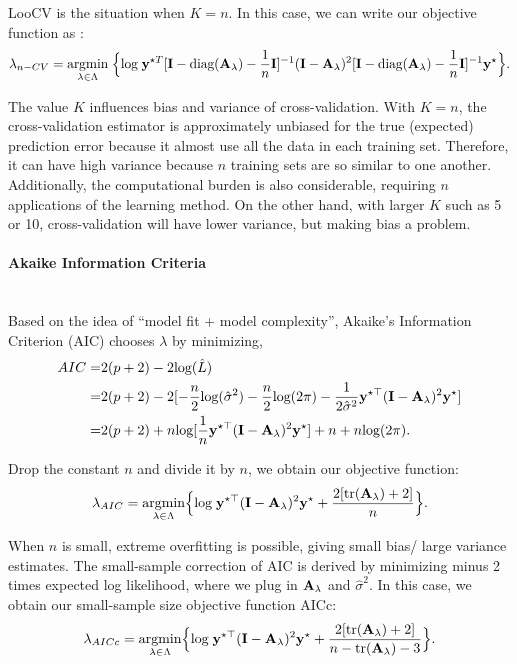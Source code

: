 \documentclass[article]{jss}
\begin{document}
LooCV is the situation when $K=n$. In this case, we can write our objective function as \citep{golub_generalized_1979}:
\begin{align}
\lambda_{n-CV}=\underset{\lambda \in \Lambda}{\mbox{argmin}}\;\Big\{\mbox{log}\;{\bf y}^{\star T}[{\bf I}-\mbox{diag}({\bf A}_\lambda)-\frac{1}{n}{\bf I}]^{-1}({\bf I}-{\bf A}_\lambda)^2[{\bf I}-\mbox{diag}({\bf A}_\lambda)-\frac{1}{n}{\bf I}]^{-1}{\bf y}^\star \Big\}. \label{3}
\end{align}

The value $K$ influences bias and variance of cross-validation. With $K=n$, the cross-validation estimator is approximately unbiased for the true (expected) prediction error because it almost use all the data in each training set. Therefore, it can have high variance because $n$ training sets are so similar to one another. Additionally, the computational burden is also considerable, requiring $n$ applications of the learning method. On the other hand, with larger $K$ such as 5 \citep{hastie_elements_2009} or 10, cross-validation will have lower variance, but making bias a problem.

\paragraph{Akaike Information Criteria}\mbox{}\\
Based on the idea of ``model fit + model complexity'', Akaike's Information Criterion (AIC) \citep{akaike_information_1998} chooses $\lambda$ by minimizing,
\begin{align*}
AIC=&2(p+2)-2\mbox{log}(\hat{L})\\
=&2(p+2)-2[-\frac{n}{2}\mbox{log} (\hat{\sigma}^2)-\frac{n}{2}\mbox{log} (2\pi)-\frac{1}{2\hat{\sigma}^2}{\bf y}^{\star \top}({\bf I}-{\bf A}_\lambda)^2{\bf y}^\star]\\
=&2(p+2)+n \mbox{log}[\frac{1}{n}{\bf y}^{\star \top}({\bf I}-{\bf A}_\lambda)^2{\bf y}^\star]+n+n \mbox{log}(2\pi).
\end{align*}

Drop the constant $n$ and divide it by $n$, we obtain our objective function:
\begin{align}
\lambda_{AIC}=\underset{\lambda \in \Lambda}{\mbox{argmin}}\Big\{\mbox{log}\; {\bf y}^{\star \top}({\bf I}-{\bf A}_\lambda)^2{\bf y}^\star+\frac{2[\mbox{tr}({\bf A}_\lambda)+2]}{n}\Big\}. \label{1}
\end{align}

When $n$ is small, extreme overfitting is possible, giving small bias/ large variance estimates. The small-sample correction of AIC \citep{hurvich_regression_1989, hurvich_clifford_m._smoothing_2002} is derived by minimizing minus 2 times expected log likelihood, where we plug in ${\bf A}_\lambda$ and $\hat{\sigma}^2$. In this case, we obtain our small-sample size objective function AICc:
\begin{align}
\lambda_{AICc}=\underset{\lambda \in \Lambda}{\mbox{argmin}}\Big\{\mbox{log}\; {\bf y}^{\star \top}({\bf I}-{\bf A}_\lambda)^2{\bf y}^\star+\frac{2[\mbox{tr}({\bf A}_\lambda)+2]}{n-\mbox{tr}({\bf A}_\lambda)-3}\Big\}. \label{2}
\end{align}
\end{document}
